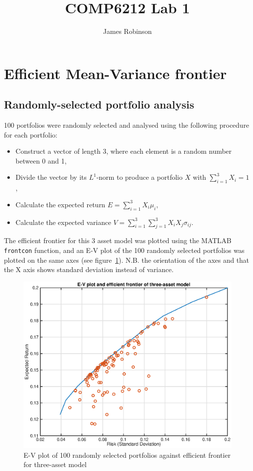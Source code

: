 \documentclass[a4paper, 12pt]{article}
\title{COMP6212 Lab 1}
\author{James Robinson}
\begin{document}
	\maketitle

	\section{Efficient Mean-Variance frontier}

	\subsection{Randomly-selected portfolio analysis}

	100 portfolios were randomly selected and analysed using the following procedure for each portfolio:

	\begin{itemize}
		\item Construct a vector of length 3, where each element is a random number between 0 and 1,
		\item Divide the vector by its $L^1$-norm to produce a portfolio $X$ with $\sum_{i=1}^3{X_i} = 1$,
		\item Calculate the expected return $E = \sum_{i=1}^3 X_i \mu_i$,
		\item Calculate the expected variance $V = \sum_{i=1}^3 \sum_{j=1}^3 X_i X_j \sigma_{ij}$.
	\end{itemize}

	The efficient frontier for this 3 asset model was plotted using the MATLAB \texttt{frontcon} function, and an E-V plot of the 100 randomly selected portfolios was plotted on the same axes (see figure~\ref{fig:p1a}). N.B. the orientation of the axes and that the X axis shows standard deviation instead of variance.

	\begin{figure}
		\begin{center}
			\includegraphics[width=0.75\linewidth]{figures/p1a.eps}
		\end{center}
		\caption{E-V plot of 100 randomly selected portfolios against efficient frontier for three-asset model}
		\label{fig:p1a}
	\end{figure}
\end{document}
